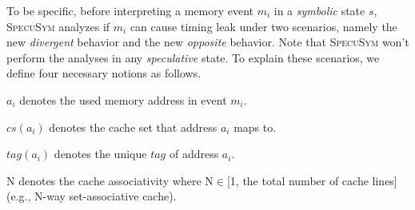 \documentclass[sigconf]{acmart}
\newcommand{\SpecuSym}{\textsc{SpecuSym} }
\begin{document}
To be specific, before interpreting a memory event $m_i$ in a \textit{symbolic} 
state $s$, \SpecuSym analyzes if $\mathit{m_i}$ can cause timing leak under two 
scenarios, namely the new \textit{divergent} behavior and the new \textit{opposite} 
behavior. Note that \SpecuSym won't perform the analyses in any \textit{speculative} 
state. To explain these scenarios, we define four necessary notions as follows.
%
%
\begin{itemize*}
  \item $\mathit{a_i}$ denotes the used memory address in event $\mathit{m_i}$.
  \item $\mathit{cs(a_i)}$ denotes the cache set that address $\mathit{a_i}$ maps to.
  \item $\mathit{tag(a_i)}$ denotes the unique $\mathit{tag}$ of address $\mathit{a_i}$.
  \item {N} denotes the cache associativity where N$\in$[1, the total number of cache lines] (e.g., N-way set-associative cache). 
\end{itemize*}
%
%
\end{document}
